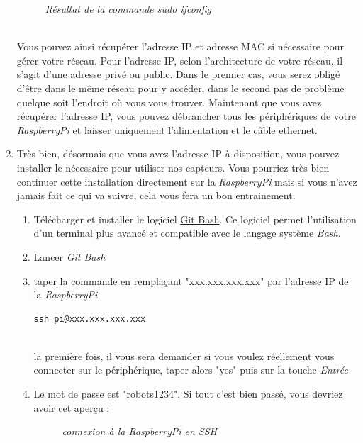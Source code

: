 \begin{enumerate}
\begin{figure}[H]
\begin{center}
\end{center}
	\caption{ \textit{Résultat de la commande sudo ifconfig}}
\end{figure}\\

Vous pouvez ainsi récupérer l'adresse IP et adresse MAC si nécessaire pour gérer votre réseau. Pour l'adresse IP, selon l'architecture de votre réseau, il s'agit d'une adresse privé ou public. Dans le premier cas, vous serez obligé d'être dans le même réseau pour y accéder, dans le second pas de problème quelque soit l'endroit où vous vous trouver.
Maintenant que vous avez récupérer l'adresse IP, vous pouvez débrancher tous les périphériques de votre \textit{RaspberryPi} et laisser uniquement l'alimentation et le câble ethernet.

	\item Très bien, désormais que vous avez l'adresse IP à disposition, vous pouvez installer le nécessaire pour utiliser nos capteurs. Vous pourriez très bien continuer cette installation directement sur la \textit{RaspberryPi} mais si vous n'avez jamais fait ce qui va suivre, cela vous fera un bon entrainement.\\

\begin{enumerate} 
	\item Télécharger et installer le logiciel \href{https://git-for-windows.github.io/}{Git Bash}. Ce logiciel permet l'utilisation d'un terminal plus avancé et compatible avec le langage système \textit{Bash}.
	\item Lancer \textit{Git Bash}
	\item taper la commande en remplaçant "xxx.xxx.xxx.xxx" par l'adresse IP de la \textit{RaspberryPi}\\
	\begin{lstlisting}[style=MyBashStyle]
	ssh pi@xxx.xxx.xxx.xxx
	\end{lstlisting}\\
la première fois, il vous sera demander si vous voulez réellement vous connecter sur le périphérique, taper alors "yes" puis sur la touche \textit{Entrée}
	\item Le mot de passe est "robots1234". Si tout c'est bien passé, vous devriez avoir cet aperçu :\\
	\begin{figure}[H]
	\begin{center}
	\end{center}
		\caption{ \textit{connexion à la RaspberryPi en SSH}}
	\end{figure}\\
	

\end{enumerate}
\end{enumerate}
